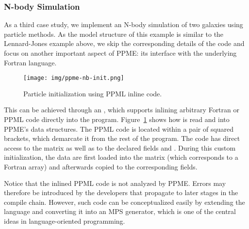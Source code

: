 \subsubsection{N-body Simulation} %
\label{par:n_body_simulation}
As a third case study, we implement an N-body simulation of two galaxies using 
particle methods. As the model structure of this example is similar to the 
Lennard-Jones example above, we skip the corresponding details
of the code and focus on another important aspect of PPME: its interface with the
underlying Fortran language. 

%
\begin{figure}
 \centering
    \texttt{[image: img/ppme-nb-init.png]}
    \caption{Particle initialization using PPML inline code.}
    \label{fig:ppme-nb}
\end{figure}
%
This can be achieved through an , which supports 
inlining arbitrary Fortran or PPML code directly into the program. Figure~\ref{fig:ppme-nb} shows how
 is read and into PPME's data structures. The PPML code is located 
within a pair of squared brackets, which demarcate it from the rest of the program. 
The code has direct access to the matrix  as well as to the declared 
fields  and . During this custom initialization, the data are first loaded into 
the matrix (which corresponds to a Fortran array) and afterwards copied to the corresponding
fields. 

Notice that the inlined PPML code is not analyzed by PPME. Errors may therefore be 
introduced by the developers that propagate to later stages in the compile chain. 
However, such code can be conceptualized easily by extending the language and
converting it into an MPS generator, which is one of the central ideas in 
language-oriented programming.  


